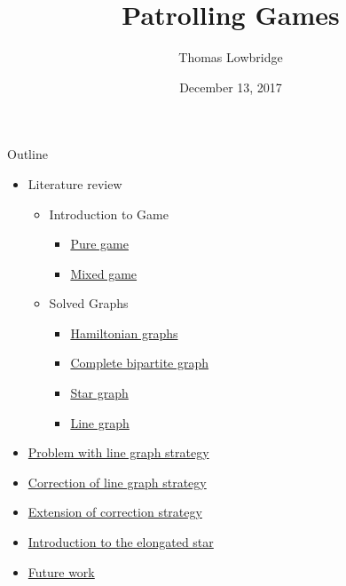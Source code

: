 \documentclass[11pt]{beamer}
\author{Thomas Lowbridge}
\title{Patrolling Games}
\institute{University Of Nottingham}
\date{December 13, 2017}
\begin{document}
\hypertarget{Patrolling Games}{}
\begin{frame}
\titlepage
\end{frame}


\begin{frame}{Outline}

\begin{itemize}
\item Literature review
 \begin{itemize}
 \item Introduction to Game
  \begin{itemize}
  \item \hyperlink{Introduction to game: Pure game}{Pure game}
  \item \hyperlink{Introduction to game: Mixed game}{Mixed game}
  \end{itemize}
 \item Solved Graphs
  \begin{itemize}
  \item \hyperlink{Solved graphs: Hamiltonian graphs}{Hamiltonian graphs}
  \item \hyperlink{Solved graphs: Complete bipartite graphs}{Complete bipartite graph}
  \item \hyperlink{Solved graphs: Star graph}{Star graph}
  \item \hyperlink{Solved graphs: Line graph}{Line graph}
  \end{itemize}   
 \end{itemize}
\item \hyperlink{Problem with diametricstrategy}{Problem with line graph strategy}
\item \hyperlink{Correction of diametric line graph strategy}{Correction of line graph strategy}
\item \hyperlink{Extension of correction strategy}{Extension of correction strategy}
\item \hyperlink{Introduction to the elongated star}{Introduction to the elongated star}
\item \hyperlink{Future work}{Future work}
\end{itemize}
\end{frame}
\end{document}
